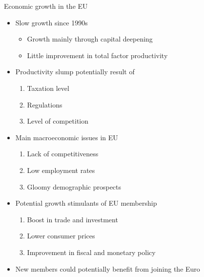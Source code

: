 \documentclass{beamer}
\begin{document}
\begin{frame}{Economic growth in the EU}
  \begin{itemize}
    \item Slow growth since 1990s 
    \begin{itemize}
      \item Growth mainly through capital deepening
      \item Little improvement in total factor productivity
    \end{itemize}
    \medskip
    \item Productivity slump potentially result of
    \begin{enumerate}
      \item Taxation level
      \item Regulations
      \item Level of competition
    \end{enumerate}
    \medskip
    \item Main macroeconomic issues in EU
    \begin{enumerate}
      \item Lack of competitiveness
      \item Low employment rates
      \item Gloomy demographic prospects
    \end{enumerate}
    \medskip
    \item Potential growth stimulants of EU membership
    \begin{enumerate}
      \item Boost in trade and investment
      \item Lower consumer prices
      \item Improvement in fiscal and monetary policy
    \end{enumerate}
    \medskip
    \item New members could potentially benefit from joining the Euro
  \end{itemize}
\end{frame}


\end{document}
